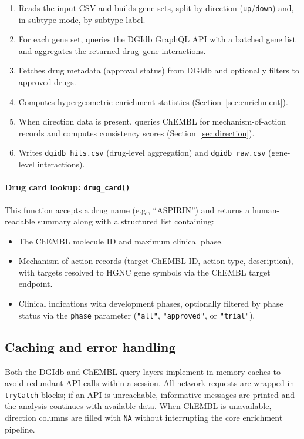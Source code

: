 \documentclass[11pt,a4paper]{article}
\begin{document}
\begin{enumerate}[noitemsep]
  \item Reads the input CSV and builds gene sets, split by direction (\texttt{up}/\texttt{down}) and, in subtype mode, by subtype label.
  \item For each gene set, queries the DGIdb GraphQL API with a batched gene list and aggregates the returned drug--gene interactions.
  \item Fetches drug metadata (approval status) from DGIdb and optionally filters to approved drugs.
  \item Computes hypergeometric enrichment statistics (Section~\ref{sec:enrichment}).
  \item When direction data is present, queries ChEMBL for mechanism-of-action records and computes consistency scores (Section~\ref{sec:direction}).
  \item Writes \texttt{dgidb\_hits.csv} (drug-level aggregation) and \texttt{dgidb\_raw.csv} (gene-level interactions).
\end{enumerate}

\paragraph{Drug card lookup: \texttt{drug\_card()}} This function accepts a drug name (e.g., ``ASPIRIN'') and returns a human-readable summary along with a structured list containing:

\begin{itemize}[noitemsep]
  \item The ChEMBL molecule ID and maximum clinical phase.
  \item Mechanism of action records (target ChEMBL ID, action type, description), with targets resolved to HGNC gene symbols via the ChEMBL target endpoint.
  \item Clinical indications with development phases, optionally filtered by phase status via the \texttt{phase} parameter (\texttt{"all"}, \texttt{"approved"}, or \texttt{"trial"}).
\end{itemize}

\subsection{Caching and error handling}

Both the DGIdb and ChEMBL query layers implement in-memory caches to avoid redundant API calls within a session. All network requests are wrapped in \texttt{tryCatch} blocks; if an API is unreachable, informative messages are printed and the analysis continues with available data. When ChEMBL is unavailable, direction columns are filled with \texttt{NA} without interrupting the core enrichment pipeline.
\end{document}
